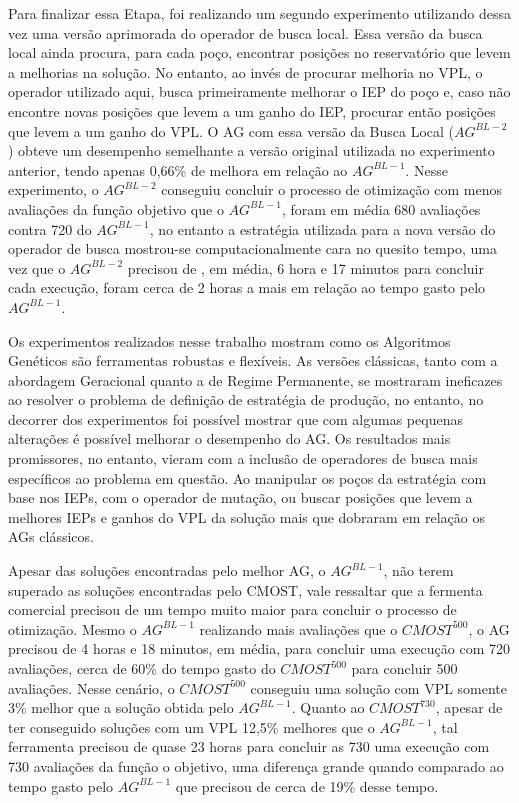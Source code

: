 Para finalizar essa Etapa, foi realizando um segundo experimento utilizando dessa vez uma versão aprimorada do operador de busca local. Essa versão da busca local ainda procura, para cada poço, encontrar posições no reservatório que levem a melhorias na solução. No entanto, ao invés de procurar melhoria no VPL, o operador utilizado aqui, busca primeiramente melhorar o IEP do poço e, caso não encontre novas posições que levem a um ganho do IEP, procurar então posições que levem a um ganho do VPL. O AG com essa versão da Busca Local ($AG^{BL-2}$) obteve um desempenho semelhante a versão original utilizada no experimento anterior, tendo apenas 0,66\% de melhora em relação ao $AG^{BL-1}$.  Nesse experimento, o $AG^{BL-2}$ conseguiu concluir o processo de otimização com menos avaliações da função objetivo que o $AG^{BL-1}$, foram em média 680 avaliações contra 720 do $AG^{BL-1}$, no entanto a estratégia utilizada para a nova versão do operador de busca mostrou-se computacionalmente cara no quesito tempo, uma vez que o $AG^{BL-2}$ precisou de , em média, 6 hora e 17 minutos para concluir cada execução, foram cerca de 2 horas a mais em relação ao tempo gasto pelo $AG^{BL-1}$.
 	
Os experimentos realizados nesse trabalho mostram como os Algoritmos Genéticos são ferramentas robustas e flexíveis. As versões clássicas, tanto com a abordagem Geracional quanto a de Regime Permanente, se mostraram ineficazes ao resolver o problema de definição de estratégia de produção, no entanto, no decorrer dos experimentos foi possível mostrar que com algumas pequenas alterações é possível melhorar o desempenho do AG. Os resultados mais promissores, no entanto, vieram com a inclusão de operadores de busca mais específicos ao problema em questão. Ao manipular os poços da estratégia com base nos IEPs, com o operador de mutação, ou buscar posições que levem a melhores IEPs e ganhos do VPL da solução mais que dobraram em relação os AGs clássicos.
 	
Apesar das soluções encontradas pelo melhor AG, o $AG^{BL-1}$, não terem superado as soluções encontradas pelo CMOST, vale ressaltar que a fermenta comercial precisou de um tempo muito maior para concluir o processo de otimização. Mesmo o $AG^{BL-1}$ realizando mais avaliações que o $CMOST^{500}$, o AG precisou de 4 horas e 18 minutos, em média, para concluir uma execução com 720 avaliações, cerca de 60\% do tempo gasto do $CMOST^{500}$ para concluir 500 avaliações. Nesse cenário, o $CMOST^{500}$ conseguiu uma solução com VPL somente 3\% melhor que a solução obtida pelo $AG^{BL-1}$. Quanto ao $CMOST^{730}$, apesar de ter conseguido soluções com um VPL 12,5\% melhores que o $AG^{BL-1}$, tal ferramenta precisou de quase 23 horas para concluir as 730 uma execução com 730 avaliações da função o objetivo, uma diferença grande quando comparado ao tempo gasto pelo $AG^{BL-1}$ que precisou de cerca de 19\% desse tempo.

